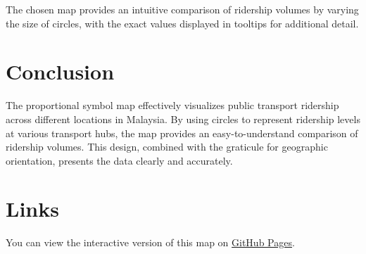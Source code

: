 \documentclass{article}
\begin{document}
The chosen map provides an intuitive comparison of ridership volumes by varying the size of circles, with the exact values displayed in tooltips for additional detail.

\section*{Conclusion}
The proportional symbol map effectively visualizes public transport ridership across different locations in Malaysia. By using circles to represent ridership levels at various transport hubs, the map provides an easy-to-understand comparison of ridership volumes. This design, combined with the graticule for geographic orientation, presents the data clearly and accurately.

\section*{Links}
You can view the interactive version of this map on \href{https://github.com/jarelgomes1/week9fit3179HW}{GitHub Pages}.
\end{document}
